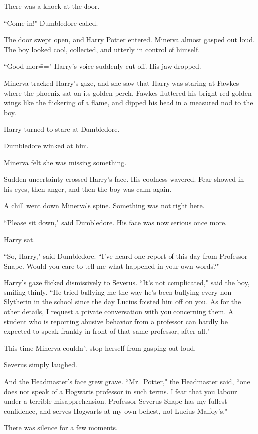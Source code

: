 There was a knock at the door.

``Come in!" Dumbledore called.

The door swept open, and Harry Potter entered. Minerva almost gasped out loud. The boy looked cool, collected, and utterly in control of himself.

``Good mor\===" Harry's voice suddenly cut off. His jaw dropped.

Minerva tracked Harry's gaze, and she saw that Harry was staring at Fawkes where the phoenix sat on its golden perch. Fawkes fluttered his bright red-golden wings like the flickering of a flame, and dipped his head in a measured nod to the boy.

Harry turned to stare at Dumbledore.

Dumbledore winked at him.

Minerva felt she was missing something.

Sudden uncertainty crossed Harry's face. His coolness wavered. Fear showed in his eyes, then anger, and then the boy was calm again.

A chill went down Minerva's spine. Something was not right here.

``Please sit down," said Dumbledore. His face was now serious once more.

Harry sat.

``So, Harry," said Dumbledore. ``I've heard one report of this day from Professor Snape. Would you care to tell me what happened in your own words?"

Harry's gaze flicked dismissively to Severus. ``It's not complicated," said the boy, smiling thinly. ``He tried bullying me the way he's been bullying every non-Slytherin in the school since the day Lucius foisted him off on you. As for the other details, I request a private conversation with you concerning them. A student who is reporting abusive behavior from a professor can hardly be expected to speak frankly in front of that same professor, after all."

This time Minerva couldn't stop herself from gasping out loud.

Severus simply laughed.

And the Headmaster's face grew grave. ``Mr.~Potter," the Headmaster said, ``one does not speak of a Hogwarts professor in such terms. I fear that you labour under a terrible misapprehension. Professor Severus Snape has my fullest confidence, and serves Hogwarts at my own behest, not Lucius Malfoy's."

There was silence for a few moments.


